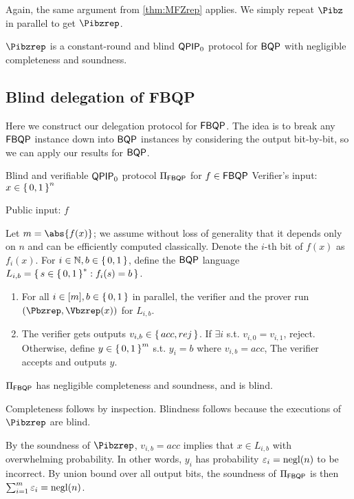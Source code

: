 Again, the same argument from \cref{thm:MFZrep} applies. We simply repeat $\Pibz$ in parallel to get $\Pibzrep$.

\begin{thm}
	\label{thm:QPIP0BQP}
	$\Pibzrep$ is a constant-round and blind $\operatorname{\mathsf{QPIP}}_0$ protocol for $\operatorname{\mathsf{BQP}}$ with negligible completeness and soundness.
\end{thm}

\subsection{Blind delegation of FBQP}
\label{subsec:BlindFBQP}

Here we construct our delegation protocol for $\operatorname{\mathsf{FBQP}}$.
The idea is to break any $\operatorname{\mathsf{FBQP}}$ instance down into $\operatorname{\mathsf{BQP}}$ instances by considering the output bit-by-bit,
so we can apply our results for $\operatorname{\mathsf{BQP}}$.

\begin{protocol}{Blind and verifiable $\operatorname{\mathsf{QPIP}}_0$ protocol $\Pi_{\operatorname{\mathsf{FBQP}}}$ for $f\in\operatorname{\mathsf{FBQP}}$}
	\label{proto:QPIP0FBQP}
	Verifier's input: $x\in\set{0, 1}^n$

	Public input: $f$

	Let $m=\abs{f(x)}$; we assume without loss of generality that it depends only on $n$ and can be efficiently computed classically.
	Denote the $i$-th bit of $f(x)$ as $f_i(x)$.
	For $i\in\mathbb{N}, b\in\set{0,1}$, define the $\operatorname{\mathsf{BQP}}$ language $L_{i, b}=\set{s\in\set{0,1}^* : f_i(s)=b}$.
	\begin{enumerate}
		\item For all $i\in[m], b\in\set{0, 1}$ in parallel, the verifier and the prover run $(\Pbzrep, \Vbzrep(x))$ for $L_{i, b}$.
		\item The verifier gets outputs $v_{i, b}\in\set{acc, rej}$.
			If $\exists i$ s.t. $v_{i,0}=v_{i,1}$, reject.
			Otherwise, define $y\in\set{0,1}^m$ s.t. $y_i = b$ where $v_{i, b}=acc$,
			The verifier accepts and outputs $y$.
	\end{enumerate}
\end{protocol}

\begin{theorem}
	$\Pi_{\operatorname{\mathsf{FBQP}}}$ has negligible completeness and soundness, and is blind.
\end{theorem}
\begin{prf}
	Completeness follows by inspection.
	Blindness follows because the executions of $\Pibzrep$ are blind.

	By the soundness of $\Pibzrep$, $v_{i, b}=acc$ implies that $x\in L_{i, b}$ with overwhelming probability.
	In other words, $y_i$ has probability $\varepsilon_i=\operatorname{negl}(n)$ to be incorrect.
	By union bound over all output bits, the soundness of $\Pi_{\operatorname{\mathsf{FBQP}}}$ is then
	$\sum_{i=1}^m \varepsilon_i=\operatorname{negl}(n)$.
\end{prf}
